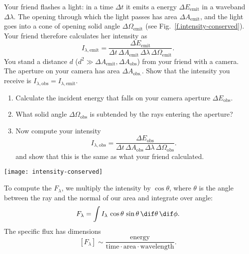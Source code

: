 \begin{exercisebox}
\label{ex.intensity-conserved}
Your friend flashes a light: in a time $\Delta t$ it emits a energy $\Delta E_{\mathrm{emit}}$ in a waveband $\Delta\lambda$. The opening through which the light passes has area $\Delta A_{\mathrm{emit}}$, and the light goes into a cone of opening solid angle $\Delta\Omega_{\mathrm{emit}}$ (see Fig.~\ref{f.intensity-conserved}). Your friend therefore calculates her intensity as
\[	
	I_{\lambda,\mathrm{emit}} = \frac{\Delta E_{\mathrm{emit}}}{\Delta t\,\Delta A_{\mathrm{emit}}\,\Delta\lambda \,\Delta\Omega_{\mathrm{emit}}}.
\]
You stand a distance $d$ ($d^{2}\gg \Delta A_{\mathrm{emit}}, \Delta A_{\mathrm{obs}}$) from your friend with a camera. The aperture on your camera has area $\Delta A_{\mathrm{obs.}}$. Show that the intensity you receive is $I_{\lambda,\mathrm{obs}} = I_{\lambda,\mathrm{emit}}$.
\begin{enumerate}
\item Calculate the incident energy that falls on your camera aperture $\Delta E_{\mathrm{obs}}$.
\item What solid angle $\Delta\Omega_{\mathrm{obs}}$ is subtended by the rays entering the aperture?
\item Now compute your intensity
\[	
	I_{\lambda,\mathrm{obs}} = \frac{\Delta E_{\mathrm{obs}}}{\Delta t\,\Delta A_{\mathrm{obs}}\,\Delta\lambda \,\Delta\Omega_{\mathrm{obs}}}.
\]
and show that this is the same as what your friend calculated.
\end{enumerate}
\end{exercisebox}
\begin{figure*}
\texttt{[image: intensity-conserved]}
\caption[Schematic of intensity being constant]{\label{f.intensity-conserved} Schematic for exercise \ref{ex.intensity-conserved}.}
\end{figure*}

To compute the  $F_{\lambda}$, we multiply the intensity by $\cos\theta$, where $\theta$ is the angle between the ray and the normal of our area and integrate over angle:
\begin{equation}\label{e.specific-flux}
F_{\lambda} =  \int I_{\lambda}\,\cos\theta\,\sin\theta\,\dif\theta\,\dif\phi.
\end{equation}
The specific flux has dimensions
\[
	[F_{\lambda}] \sim \frac{\textrm{energy}}{\textrm{time}\cdot\textrm{area}\cdot\textrm{wavelength}}.
\]


